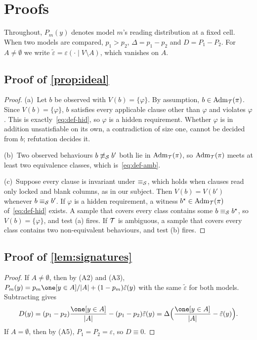 \section{Proofs}
\label{app:proofs}

Throughout, $P_m(y)$ denotes model $m$'s reading distribution at a fixed cell. When two models are compared, $p_1>p_2$, $\Delta=p_1-p_2$ and $D=P_1-P_2$. For $A\neq\emptyset$ we write $\tilde\varepsilon=\varepsilon(\cdot\mid V\setminus A)$, which vanishes on $A$.

\subsection{Proof of \cref{prop:ideal}}

\begin{proof}
(a)~Let $b$ be observed with $V(b)=\{\varphi\}$. By assumption, $b\in\mathrm{Adm}_{\mathcal{T}}(\pi)$. Since $V(b)=\{\varphi\}$, $b$ satisfies every applicable clause other than $\varphi$ and violates $\varphi$. This is exactly~\eqref{eq:def-hid}, so $\varphi$ is a hidden requirement. Whether $\varphi$ is in addition unsatisfiable on its own, a contradiction of size one, cannot be decided from $b$; refutation decides it.

(b)~Two observed behaviours $b\not\equiv_{\mathcal{S}} b'$ both lie in $\mathrm{Adm}_{\mathcal{T}}(\pi)$, so $\mathrm{Adm}_{\mathcal{T}}(\pi)$ meets at least two equivalence classes, which is~\eqref{eq:def-amb}.

(c)~Suppose every clause is invariant under $\equiv_{\mathcal{S}}$, which holds when clauses read only locked and blank columns, as in our subject. Then $V(b)=V(b')$ whenever $b\equiv_{\mathcal{S}} b'$. If $\varphi$ is a hidden requirement, a witness $b^\star\in\mathrm{Adm}_{\mathcal{T}}(\pi)$ of~\eqref{eq:def-hid} exists. A sample that covers every class contains some $b\equiv_{\mathcal{S}} b^\star$, so $V(b)=\{\varphi\}$, and test (a) fires. If $\mathcal{T}$ is ambiguous, a sample that covers every class contains two non-equivalent behaviours, and test (b) fires.
\end{proof}

\subsection{Proof of \cref{lem:signatures}}

\begin{proof}
If $A\neq\emptyset$, then by (A2) and (A3), $P_m(y)=p_m\one[y\in A]/|A|+(1-p_m)\tilde\varepsilon(y)$ with the same $\tilde\varepsilon$ for both models. Subtracting gives
\[
D(y)=(p_1-p_2)\frac{\one[y\in A]}{|A|}-(p_1-p_2)\tilde\varepsilon(y)=\Delta\Bigl(\frac{\one[y\in A]}{|A|}-\tilde\varepsilon(y)\Bigr).
\]
If $A=\emptyset$, then by (A5), $P_1=P_2=\varepsilon$, so $D\equiv0$.
\end{proof}


